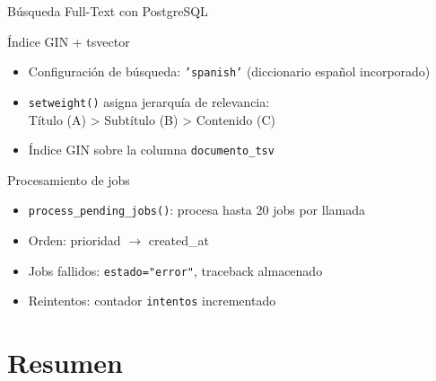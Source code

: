 \documentclass[11pt,aspectratio=169,spanish]{beamer}
\begin{document}
\begin{frame}[fragile]{Búsqueda Full-Text con PostgreSQL}
    \begin{block}{Índice GIN + tsvector}
        \begin{itemize}
            \item Configuración de búsqueda: \texttt{'spanish'} (diccionario español incorporado)
            \item \texttt{setweight()} asigna jerarquía de relevancia: \\
              Título (A) > Subtítulo (B) > Contenido (C)
            \item Índice GIN sobre la columna \texttt{documento\_tsv}
        \end{itemize}
    \end{block}

    \vspace{0.3cm}
    \begin{block}{Procesamiento de jobs}
        \begin{itemize}
            \item \texttt{process\_pending\_jobs()}: procesa hasta 20 jobs por llamada
            \item Orden: prioridad $\to$ created\_at
            \item Jobs fallidos: \texttt{estado="error"}, traceback almacenado
            \item Reintentos: contador \texttt{intentos} incrementado
        \end{itemize}
    \end{block}
\end{frame}

\section{Resumen}
\end{document}

